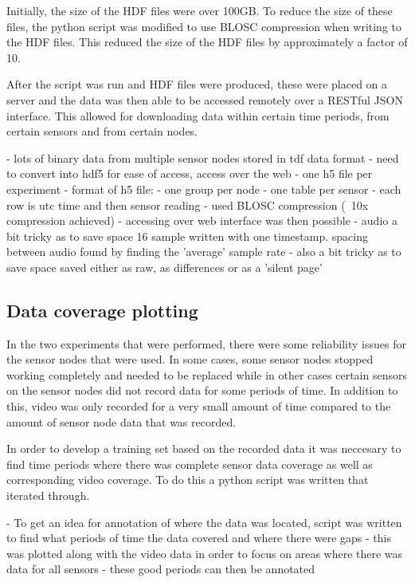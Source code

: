 Initially, the size of the HDF files were over 100GB. To reduce the size of these files, the python script was modified to use BLOSC compression when writing to the HDF files. This reduced the size of the HDF files by approximately a factor of 10. 

After the script was run and HDF files were produced, these were placed on a server and the data was then able to be accessed remotely over a RESTful JSON interface. This allowed for downloading data within certain time periods, from certain sensors and from certain nodes. 

- lots of binary data from multiple sensor nodes stored in tdf data format
- need to convert into hdf5 for ease of access, access over the web
	- one h5 file per experiment
	- format of h5 file:
		- one group per node	
		- one table per sensor	
		- each row is utc time and then sensor reading
- used BLOSC compression (~10x compression achieved)
- accessing over web interface was then possible 
- audio a bit tricky as to save space 16 sample written with one timestamp. spacing between audio found by finding the 'average' sample rate 
	- also a bit tricky as to save space saved either as raw, as differences or as a 'silent page'

\subsection{Data coverage plotting}

In the two experiments that were performed, there were some reliability issues for the sensor nodes that were used. In some cases, some sensor nodes stopped working completely and needed to be replaced while in other cases certain sensors on the sensor nodes did not record data for some periods of time. In addition to this, video was only recorded for a very small amount of time compared to the amount of sensor node data that was recorded. 

In order to develop a training set based on the recorded data it was neccesary to find time periods where there was complete sensor data coverage as well as corresponding video coverage. To do this a python script was written that iterated through.


- To get an idea for annotation of where the data was located, script was written to find what periods of time the data covered and where there were gaps
- this was plotted along with the video data in order to focus on areas where there was data for all sensors
- these good periods can then be annotated

